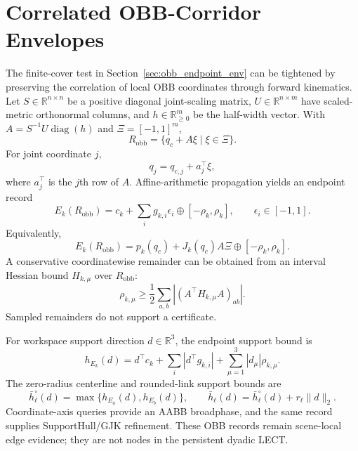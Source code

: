 \documentclass[journal]{IEEEtran}
\newcommand{\Real}{\ensuremath{\mathbb{R}}}
\begin{document}
\FloatBarrier
\section{Correlated OBB-Corridor Envelopes}\label{app:obb_corridor}

The finite-cover test in Section~\ref{sec:obb_endpoint_env} can be tightened by
preserving the correlation of local OBB coordinates through forward kinematics.
Let $S\in\Real^{n\times n}$ be a positive diagonal joint-scaling matrix,
$U\in\Real^{n\times m}$ have scaled-metric orthonormal columns, and
$h\in\Real_{\ge0}^m$ be the half-width vector. With
$A=S^{-1}U\operatorname{diag}(h)$ and $\Xi=[-1,1]^{m}$,
\[
R_{\mathrm{obb}}=\{q_c+A\xi\mid\xi\in\Xi\}.
\]
For joint coordinate $j$,
\[
q_j=q_{c,j}+a_j^\top\xi,
\]
where $a_j^\top$ is the $j$th row of $A$. Affine-arithmetic propagation yields
an endpoint record
\[
E_k(R_{\mathrm{obb}})=
c_k+\sum_i g_{k,i}\epsilon_i\oplus[-\rho_k,\rho_k],
\qquad \epsilon_i\in[-1,1].
\]
Equivalently,
\[
E_k(R_{\mathrm{obb}})=
p_k(q_c)+J_k(q_c)A\Xi\oplus[-\rho_k,\rho_k].
\]
A conservative coordinatewise remainder can be obtained from an interval Hessian
bound $H_{k,\mu}$ over $R_{\mathrm{obb}}$:
\[
\rho_{k,\mu}\ge
\frac{1}{2}\sum_{a,b}
\left|\left(A^\top H_{k,\mu}A\right)_{ab}\right|.
\]
Sampled remainders do not support a certificate.

For workspace support direction $d\in\Real^3$, the endpoint support bound is
\[
h_{E_k}(d)=d^\top c_k+\sum_i|d^\top g_{k,i}|
+\sum_{\mu=1}^{3}|d_\mu|\rho_{k,\mu}.
\]
The zero-radius centerline and rounded-link support bounds are
\[
\bar h_\ell^\circ(d)=\max\{h_{E_a}(d),h_{E_b}(d)\},
\qquad
\bar h_\ell(d)=\bar h_\ell^\circ(d)+r_\ell\|d\|_2.
\]
Coordinate-axis queries provide an AABB broadphase, and the same record supplies
SupportHull/GJK refinement. These OBB records remain scene-local edge evidence;
they are not nodes in the persistent dyadic LECT.

\IEEEtriggercmd{\enlargethispage{2\baselineskip}}


\end{document}
